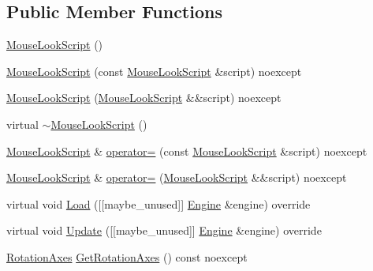 \subsection*{Public Member Functions}
\begin{DoxyCompactItemize}
\item 
\hyperlink{classmage_1_1script_1_1_mouse_look_script_a9055e93385160f4074cd2bc7fda3869e}{Mouse\+Look\+Script} ()
\item 
\hyperlink{classmage_1_1script_1_1_mouse_look_script_aa5237c229f27fa29f820bf6517209444}{Mouse\+Look\+Script} (const \hyperlink{classmage_1_1script_1_1_mouse_look_script}{Mouse\+Look\+Script} \&script) noexcept
\item 
\hyperlink{classmage_1_1script_1_1_mouse_look_script_ac21a383d6718ccc0d6c9faa5c5c1fe50}{Mouse\+Look\+Script} (\hyperlink{classmage_1_1script_1_1_mouse_look_script}{Mouse\+Look\+Script} \&\&script) noexcept
\item 
virtual \hyperlink{classmage_1_1script_1_1_mouse_look_script_a29a6d2cb4742fbf745822d015e72484f}{$\sim$\+Mouse\+Look\+Script} ()
\item 
\hyperlink{classmage_1_1script_1_1_mouse_look_script}{Mouse\+Look\+Script} \& \hyperlink{classmage_1_1script_1_1_mouse_look_script_a08731370926cbaee931170fd3fb108e6}{operator=} (const \hyperlink{classmage_1_1script_1_1_mouse_look_script}{Mouse\+Look\+Script} \&script) noexcept
\item 
\hyperlink{classmage_1_1script_1_1_mouse_look_script}{Mouse\+Look\+Script} \& \hyperlink{classmage_1_1script_1_1_mouse_look_script_aaff03f361a4e302c51e4210bb2e9ca8b}{operator=} (\hyperlink{classmage_1_1script_1_1_mouse_look_script}{Mouse\+Look\+Script} \&\&script) noexcept
\item 
virtual void \hyperlink{classmage_1_1script_1_1_mouse_look_script_a00c8dc8ebaf67da13bd0bc45de3ad8b6}{Load} (\mbox{[}\mbox{[}maybe\+\_\+unused\mbox{]}\mbox{]} \hyperlink{classmage_1_1_engine}{Engine} \&engine) override
\item 
virtual void \hyperlink{classmage_1_1script_1_1_mouse_look_script_a3b78aebd104b061f5d176843ef58a48a}{Update} (\mbox{[}\mbox{[}maybe\+\_\+unused\mbox{]}\mbox{]} \hyperlink{classmage_1_1_engine}{Engine} \&engine) override
\item 
\hyperlink{classmage_1_1script_1_1_mouse_look_script_a662018db64c5dc84a958eb1c6123a829}{Rotation\+Axes} \hyperlink{classmage_1_1script_1_1_mouse_look_script_a612d8c23cc3f0711a07b32304082dfb5}{Get\+Rotation\+Axes} () const noexcept
\item 

\end{DoxyCompactItemize}
